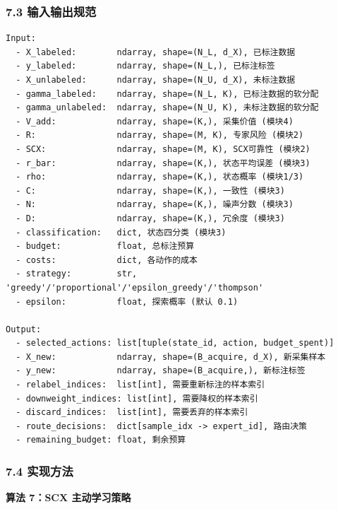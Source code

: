\documentclass[
  12pt,
]{ctexart}
\begin{document}
\subsubsection{7.3
输入输出规范}\label{ux8f93ux5165ux8f93ux51faux89c4ux8303-6}

\begin{verbatim}
Input:
  - X_labeled:        ndarray, shape=(N_L, d_X), 已标注数据
  - y_labeled:        ndarray, shape=(N_L,), 已标注标签
  - X_unlabeled:      ndarray, shape=(N_U, d_X), 未标注数据
  - gamma_labeled:    ndarray, shape=(N_L, K), 已标注数据的软分配
  - gamma_unlabeled:  ndarray, shape=(N_U, K), 未标注数据的软分配
  - V_add:            ndarray, shape=(K,), 采集价值 (模块4)
  - R:                ndarray, shape=(M, K), 专家风险 (模块2)
  - SCX:              ndarray, shape=(M, K), SCX可靠性 (模块2)
  - r_bar:            ndarray, shape=(K,), 状态平均误差 (模块3)
  - rho:              ndarray, shape=(K,), 状态概率 (模块1/3)
  - C:                ndarray, shape=(K,), 一致性 (模块3)
  - N:                ndarray, shape=(K,), 噪声分数 (模块3)
  - D:                ndarray, shape=(K,), 冗余度 (模块3)
  - classification:   dict, 状态四分类 (模块3)
  - budget:           float, 总标注预算
  - costs:            dict, 各动作的成本
  - strategy:         str, 'greedy'/'proportional'/'epsilon_greedy'/'thompson'
  - epsilon:          float, 探索概率 (默认 0.1)

Output:
  - selected_actions: list[tuple(state_id, action, budget_spent)]
  - X_new:            ndarray, shape=(B_acquire, d_X), 新采集样本
  - y_new:            ndarray, shape=(B_acquire,), 新标注标签
  - relabel_indices:  list[int], 需要重新标注的样本索引
  - downweight_indices: list[int], 需要降权的样本索引
  - discard_indices:  list[int], 需要丢弃的样本索引
  - route_decisions:  dict[sample_idx -> expert_id], 路由决策
  - remaining_budget: float, 剩余预算
\end{verbatim}

\subsubsection{7.4 实现方法}\label{ux5b9eux73b0ux65b9ux6cd5-6}

\textbf{算法 7：SCX 主动学习策略}
\end{document}
